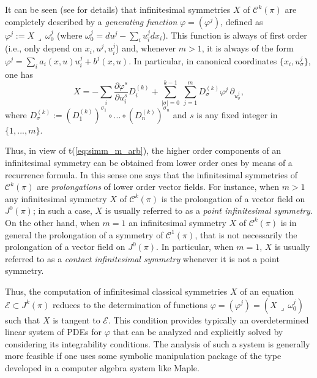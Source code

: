 \documentclass[12pt,english]{elsarticle}
\theoremstyle{plain}
\theoremstyle{plain}
\theoremstyle{remark}
\theoremstyle{plain}
\theoremstyle{definition}
\theoremstyle{definition}
\begin{document}
It can be seen (see \cite{B_KrV} for details) that infinitesimal symmetries
$X$ of $\mathcal{C}^{k}(\pi )$ are completely described by a
\textit{generating function} $\varphi =(\varphi ^{j})$, defined as
$\varphi ^{j}:=X\,\lrcorner \,\omega _{0}^{j}$ (where
$\omega _{0}^{j}=du^{j}-\sum _{i}u_{i}^{j}dx_{i}$). This function is always
of first order (i.e., only depend on $x_{i},u^{j},u_{i}^{j}$) and, whenever
$m>1$, it is always of the form
$\varphi ^{j}=\sum _{i}a_{i}(x,u)u_{i}^{j}+b^{j}(x,u)$. In particular,
in canonical coordinates $\{x_{i},u_{\sigma}^{j}\}$, one has
%
\begin{equation}
X=-\sum _{i}\frac{\partial \varphi ^{s}}{\partial u_{i}^{s}}D_{i}^{(k)}+
\sum _{|\sigma |=0}^{k-1}\,\sum _{j=1}^{m}D_{\sigma}^{(k)}\varphi ^{j}
\,\partial _{u_{\sigma}^{j}},
\label{eq:simm_m_arb}
\end{equation}
%
where
$D_{\sigma}^{(k)}:=\left (D_{1}^{(k)}\right )^{\sigma _{1}}\circ ...
\circ \left (D_{n}^{(k)}\right )^{\sigma _{n}}$ and $s$ is any fixed integer
in $\{1,...,m\}$.

Thus, in view of t{(\ref{eq:simm_m_arb})}, the higher order components of
an infinitesimal symmetry can be obtained from lower order ones by means
of a recurrence formula. In this sense one says that the infinitesimal
symmetries of $\mathcal{C}^{k}(\pi )$ are \textit{prolongations} of lower
order vector fields. For instance, when $m>1$ any infinitesimal symmetry
$X$ of $\mathcal{C}^{k}(\pi )$ is the prolongation of a vector field on
$J^{0}(\pi )$; in such a case, $X$ is usually referred to as a
\textit{point infinitesimal symmetry}. On the other hand, when $m=1$ an
infinitesimal symmetry $X$ of $\mathcal{C}^{k}(\pi )$ is in general the
prolongation of a symmetry of $\mathcal{C}^{1}(\pi )$, that is not necessarily
the prolongation of a vector field on $J^{0}(\pi )$. In particular, when
$m=1$, $X$ is usually referred to as a
\textit{contact infinitesimal symmetry} whenever it is not a point symmetry.

Thus, the computation of infinitesimal classical symmetries $X$ of an equation
$\mathcal{E}\subset J^{k}(\pi )$ reduces to the determination of functions
$\varphi =(\varphi ^{j})=(X\,\lrcorner \,\omega _{0}^{j})$ such that
$X$ is tangent to $\mathcal{E}$. This condition provides typically an overdetermined
linear system of PDEs for $\varphi $ that can be analyzed and explicitly
solved by considering its integrability conditions. The analysis of such
a system is generally more feasible if one uses some symbolic manipulation
package of the type developed in a computer algebra system like Maple.
\end{document}
